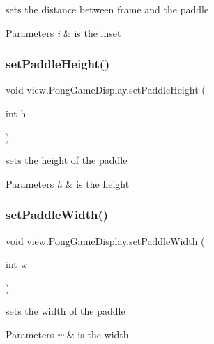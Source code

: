 sets the distance between frame and the paddle 


\begin{DoxyParams}{Parameters}
{\em i} & is the inset \\
\hline
\end{DoxyParams}
\hypertarget{classview_1_1_pong_game_display_a5c855e1e459838b82e976cd957da5cc5}{}\label{classview_1_1_pong_game_display_a5c855e1e459838b82e976cd957da5cc5} 
\subsubsection{\texorpdfstring{set\+Paddle\+Height()}{setPaddleHeight()}}
{\footnotesize\ttfamily void view.\+Pong\+Game\+Display.\+set\+Paddle\+Height (\begin{DoxyParamCaption}\item[{int}]{h }\end{DoxyParamCaption})}



sets the height of the paddle 


\begin{DoxyParams}{Parameters}
{\em h} & is the height \\
\hline
\end{DoxyParams}
\hypertarget{classview_1_1_pong_game_display_ac42d38f9ed29e2ab2bec6c7da46f1c0e}{}\label{classview_1_1_pong_game_display_ac42d38f9ed29e2ab2bec6c7da46f1c0e} 
\subsubsection{\texorpdfstring{set\+Paddle\+Width()}{setPaddleWidth()}}
{\footnotesize\ttfamily void view.\+Pong\+Game\+Display.\+set\+Paddle\+Width (\begin{DoxyParamCaption}\item[{int}]{w }\end{DoxyParamCaption})}



sets the width of the paddle 


\begin{DoxyParams}{Parameters}
{\em w} & is the width \\
\hline
\end{DoxyParams}
\hypertarget{classview_1_1_pong_game_display_a8b9caa56b471453556b7380ee6d37340}{}\label{classview_1_1_pong_game_display_a8b9caa56b471453556b7380ee6d37340} 
